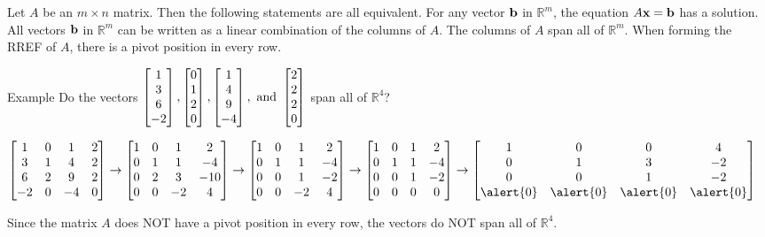 \documentclass[xcolor=dvipsnames,aspectratio=169,t]{beamer}
\begin{document}
\begin{frame}
  \bbox
  Let $A$ be an $m \times n$ matrix. Then the following statements are all equivalent.
  \bb
  \ii For any vector $\mathbf{b}$ in $\mathbb{R}^m$, the equation $A\mathbf{x} = \mathbf{b}$ has a solution.
  \ii All vectors $\mathbf{b}$ in $\mathbb{R}^m$ can be written as a linear combination of the columns of $A$.
  \ii The columns of $A$ span all of $\mathbb{R}^m$.
  \ii When forming the RREF of $A$, there is a pivot position in every row.
  \ee
  \ebox
\end{frame}

\begin{frame}{Example}
  \bbox
  Do the vectors $\displaystyle 
    \begin{bmatrix} 1 \\ 3 \\ 6 \\ -2 \end{bmatrix},
    \begin{bmatrix} 0\\ 1 \\ 2 \\ 0 \end{bmatrix},
    \begin{bmatrix} 1 \\ 4 \\ 9 \\ -4 \end{bmatrix} , 
    \mbox{ and } \begin{bmatrix} 2 \\ 2 \\ 2 \\ 0 \end{bmatrix}$ span all of $\mathbb{R}^4$?
  \ebox
  \bigskip

  \pause
  {\small
  \[ \hspace*{-1em}
  \bbm 1 & 0 & 1 & 2 \\
  3 & 1 & 4 & 2 \\
  6 & 2 & 9 & 2\\
  -2 & 0 & -4 & 0 \ebm \rightarrow
  \bbm 1 & 0 & 1 & 2 \\
  0 & 1 & 1 & -4 \\
  0 & 2 & 3 & -10\\
  0 & 0 & -2 & 4 \ebm \rightarrow
  \bbm 1 & 0 & 1 & 2 \\
  0 & 1 & 1 & -4 \\
  0 & 0 & 1 & -2\\
  0 & 0 & -2 & 4 \ebm \rightarrow
  \bbm 1 & 0 & 1 & 2 \\
  0 & 1 & 1 & -4 \\
  0 & 0 & 1 & -2\\
  0 & 0 & 0 & 0 \ebm 
  \rightarrow
  \bbm 1 & 0 & 0 & 4 \\
  0 & 1 & 3 & -2 \\
  0 & 0 & 1 & -2\\
  \alert{0} & \alert{0} & \alert{0} & \alert{0} \ebm \]
  }
  \bigskip

  {\small 
  Since the matrix $A$ does \alert{NOT} have a pivot position in every row, the vectors do \alert{NOT} span all of $\mathbb{R}^4$.}

\end{frame}
\end{document}
